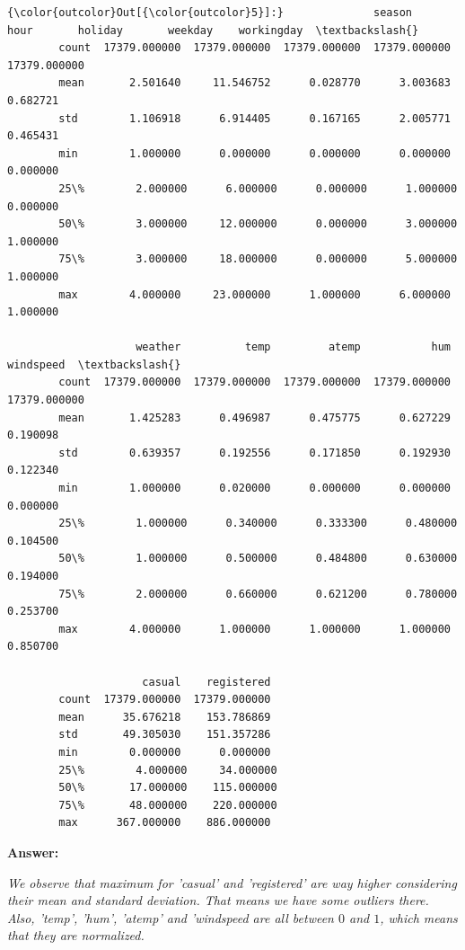\documentclass[11pt]{article}
\begin{document}
\begin{Verbatim}[commandchars=\\\{\}]
{\color{outcolor}Out[{\color{outcolor}5}]:}              season          hour       holiday       weekday    workingday  \textbackslash{}
        count  17379.000000  17379.000000  17379.000000  17379.000000  17379.000000   
        mean       2.501640     11.546752      0.028770      3.003683      0.682721   
        std        1.106918      6.914405      0.167165      2.005771      0.465431   
        min        1.000000      0.000000      0.000000      0.000000      0.000000   
        25\%        2.000000      6.000000      0.000000      1.000000      0.000000   
        50\%        3.000000     12.000000      0.000000      3.000000      1.000000   
        75\%        3.000000     18.000000      0.000000      5.000000      1.000000   
        max        4.000000     23.000000      1.000000      6.000000      1.000000   
        
                    weather          temp         atemp           hum     windspeed  \textbackslash{}
        count  17379.000000  17379.000000  17379.000000  17379.000000  17379.000000   
        mean       1.425283      0.496987      0.475775      0.627229      0.190098   
        std        0.639357      0.192556      0.171850      0.192930      0.122340   
        min        1.000000      0.020000      0.000000      0.000000      0.000000   
        25\%        1.000000      0.340000      0.333300      0.480000      0.104500   
        50\%        1.000000      0.500000      0.484800      0.630000      0.194000   
        75\%        2.000000      0.660000      0.621200      0.780000      0.253700   
        max        4.000000      1.000000      1.000000      1.000000      0.850700   
        
                     casual    registered  
        count  17379.000000  17379.000000  
        mean      35.676218    153.786869  
        std       49.305030    151.357286  
        min        0.000000      0.000000  
        25\%        4.000000     34.000000  
        50\%       17.000000    115.000000  
        75\%       48.000000    220.000000  
        max      367.000000    886.000000  
\end{Verbatim}
            
    \textbf{Answer:}

\emph{We observe that maximum for 'casual' and 'registered' are way
higher considering their mean and standard deviation. That means we have
some outliers there. Also, 'temp', 'hum', 'atemp' and 'windspeed are all
between \(0\) and \(1\), which means that they are normalized.}
\end{document}
